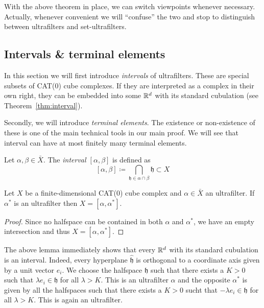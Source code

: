 \begin{rem}
  With the above theorem in place, we can switch viewpoints whenever necessary. Actually, whenever convenient we will \enquote{confuse} the two and stop to distinguish between ultrafilters and set-ultrafilters.
\end{rem}

\subsection{Intervals \& terminal elements}
\label{sec:terminal-elements}

In this section we will first introduce \emph{intervals} of ultrafilters. These are special subsets of CAT(0) cube complexes. If they are interpreted as a complex in their own right, they can be embedded into some \(\mathbb{R}^d\) with its standard cubulation (see Theorem~\ref{thm:interval}).

Secondly, we will introduce \emph{terminal elements}. The existence or non-existence of these is one of the main technical tools in our main proof. We will see that interval can have at most finitely many terminal elements.

\begin{defin}
  \label{defin:uf-interval}
  Let \(\alpha,\beta \in \bar X\). The \emph{interval \([\alpha,\beta]\)} is defined as
  \[
    [\alpha,\beta] \coloneqq \bigcap_{\mathfrak{h} \in \alpha \cap \beta} \mathfrak{h} \subset X
  \]
\end{defin}

\begin{lemma}
  \label{lem:x-interval}
  Let \(X\) be a finite-dimensional CAT(0) cube complex and \(\alpha \in \bar X\) an ultrafilter. If \(\alpha^\ast\) is an ultrafilter then \(X = [\alpha, \alpha^\ast]\).
\end{lemma}

\begin{proof}
  Since no halfspace can be contained in both \(\alpha\) and \(\alpha^\ast\), we have an empty intersection and thus \(X = [\alpha, \alpha^\ast]\).
\end{proof}

\begin{bsp}
  \label{bsp:euclidean-interval}
  The above lemma immediately shows that every \(\mathbb{R}^d\) with its standard cubulation is an interval. Indeed, every hyperplane \(\mathfrak{\hat h}\) is orthogonal to a coordinate axis given by a unit vector \(e_i\). We choose the halfspace \(\mathfrak{h}\) such that there exists a \(K>0\) such that \(\lambda e_i \in \mathfrak{h}\) for all \(\lambda > K\). This is an ultrafilter \(\alpha\) and the opposite \(\alpha^\ast\) is given by all the halfspaces such that there exists a \(K > 0\) sucht that \(-\lambda e_i \in \mathfrak{h}\) for all \(\lambda > K\). This is again an ultrafilter. 
\end{bsp}

